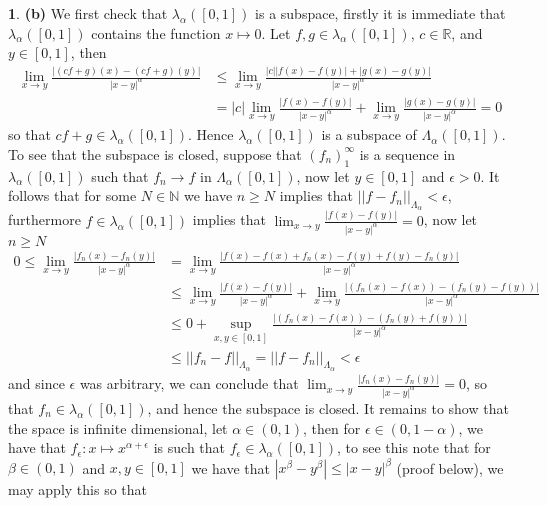 \documentclass[10.5pt]{article}
\theoremstyle{definition}
\newtheorem{pb}{}
\newcommand{\abs}[1]{\left\vert#1\right\vert}
\newcommand{\norm}[1]{\lvert\lvert#1\rvert\rvert}
\begin{document}
\begin{pb}
            \textbf{(b)} We first check that \(\lambda_\alpha([0,1])\) is a subspace, firstly it is immediate that \(\lambda_\alpha([0,1])\) contains the function \(x \mapsto 0\). Let \(f,g \in \lambda_\alpha([0,1])\), \(c \in \mathbb{R}\), and \(y \in [0,1]\), then
            \begin{align*}
                \lim_{x \to y} \frac{\abs{(cf + g)(x) - (cf + g)(y)}}{\abs{x-y}^\alpha} &\leq \lim_{x \to y}\frac{\abs{c}\abs{f(x) - f(y)} + \abs{g(x) - g(y)}}{\abs{x-y}^\alpha} \\ &= \abs{c}\lim_{x\to y}\frac{\abs{f(x) - f(y)}}{\abs{x-y}^\alpha} + \lim_{x\to y}\frac{\abs{g(x) - g(y)}}{\abs{x-y}^\alpha} = 0
            \end{align*}
            so that \(cf + g \in \lambda_\alpha([0,1])\). Hence \(\lambda_\alpha([0,1])\) is a subspace of \(\Lambda_\alpha([0,1])\). To see that the subspace is closed, suppose that \((f_n)_1^\infty\) is a sequence in \(\lambda_\alpha([0,1])\) such that \(f_n \to f\) in \(\Lambda_\alpha([0,1])\), now let \(y \in [0,1]\) and \(\epsilon > 0\). It follows that for some \(N \in \mathbb{N}\) we have \(n \geq N\) implies that \(\norm{f - f_n}_{\Lambda_\alpha} < \epsilon\), furthermore \(f \in \lambda_\alpha([0,1])\) implies that \(\lim_{x \to y} \frac{\abs{f(x) - f(y)}}{\abs{x-y}^\alpha} = 0\), now let \(n \geq N\)
            \begin{align*}
                0 \leq \lim_{x \to y}\frac{\abs{f_n(x) - f_n(y)}}{\abs{x-y}^\alpha} &= \lim_{x \to y}\frac{\abs{f(x) - f(x) + f_n(x) - f(y) + f(y) - f_n(y)}}{\abs{x-y}^\alpha} \\
                &\leq \lim_{x \to y}\frac{\abs{f(x) - f(y)}}{\abs{x-y}^\alpha} + \lim_{x \to y}\frac{\abs{(f_n(x) - f(x)) - (f_n(y) - f(y))}}{\abs{x-y}^\alpha} \\
                &\leq 0 + \sup_{x,y \in [0,1]}\frac{\abs{(f_n(x) - f(x)) - (f_n(y) + f(y))}}{\abs{x-y}^\alpha} \\
                &\leq \norm{f_n - f}_{\Lambda_\alpha} = \norm{f - f_n}_{\Lambda_\alpha} < \epsilon
            \end{align*}
            and since \(\epsilon\) was arbitrary, we can conclude that \(\lim_{x \to y}\frac{\abs{f_n(x) - f_n(y)}}{\abs{x-y}^\alpha} = 0\), so that \(f_n \in \lambda_\alpha([0,1])\), and hence the subspace is closed. It remains to show that the space is infinite dimensional, let \(\alpha \in (0,1)\), then for \(\epsilon \in (0,1-\alpha)\), we have that \(f_\epsilon: x \mapsto x^{\alpha + \epsilon}\) is such that \(f_\epsilon \in \lambda_\alpha([0,1])\), to see this note that for \(\beta \in (0,1)\) and \(x,y \in [0,1]\) we have that \(\abs{x^\beta - y^\beta} \leq \abs{x-y}^\beta\) (proof below), we may apply this so that

\end{pb}
\end{document}
